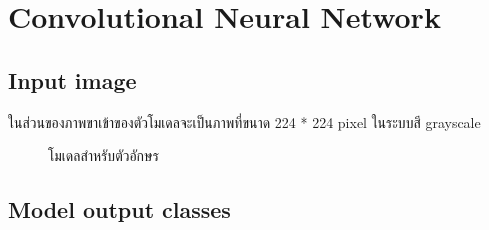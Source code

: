 \documentclass[12pt,oneside,openright,a4paper]{cpe-thai-project}
\begin{document}
\section{Convolutional Neural Network}
    \subsection{Input image}
      ในส่วนของภาพขาเข้าของตัวโมเดลจะเป็นภาพที่ขนาด 224 * 224 pixel ในระบบสี grayscale
      \begin{figure}[!ht]\centering
        \setlength{\fboxrule}{0.2mm} %
        \setlength{\fboxsep}{1cm}
        \caption{โมเดลสำหรับตัวอักษร}\label{fig:modelarchitecturevowel}
       \end{figure}
      \newpage
    \subsection{Model output classes}
\end{document}
